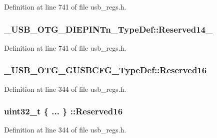 Definition at line 741 of file usb\-\_\-regs.\-h.

\hypertarget{group___u_s_b___o_t_g___d_r_i_v_e_r_gaa80385fefe8695d6ae753cfceb278786}{
\subsubsection[{Reserved14\-\_\-31}]{ \-\_\-\-U\-S\-B\-\_\-\-O\-T\-G\-\_\-\-D\-I\-E\-P\-I\-N\-Tn\-\_\-\-Type\-Def\-::\-Reserved14\-\_}}\label{group___u_s_b___o_t_g___d_r_i_v_e_r_gaa80385fefe8695d6ae753cfceb278786}


Definition at line 741 of file usb\-\_\-regs.\-h.

\hypertarget{group___u_s_b___o_t_g___d_r_i_v_e_r_ga88cd3b51dbbb01de8dcb247f6b63fe5a}{
\subsubsection[{Reserved16}]{ \-\_\-\-U\-S\-B\-\_\-\-O\-T\-G\-\_\-\-G\-U\-S\-B\-C\-F\-G\-\_\-\-Type\-Def\-::\-Reserved16}}\label{group___u_s_b___o_t_g___d_r_i_v_e_r_ga88cd3b51dbbb01de8dcb247f6b63fe5a}


Definition at line 344 of file usb\-\_\-regs.\-h.

\hypertarget{group___u_s_b___o_t_g___d_r_i_v_e_r_gada2a92cc5b87cf2e1dc7c424a8f27c3a}{
\subsubsection[{Reserved16}]{\setlength{\rightskip}{0pt plus 5cm}uint32\-\_\-t \{ ... \} \-::Reserved16}}\label{group___u_s_b___o_t_g___d_r_i_v_e_r_gada2a92cc5b87cf2e1dc7c424a8f27c3a}


Definition at line 344 of file usb\-\_\-regs.\-h.

